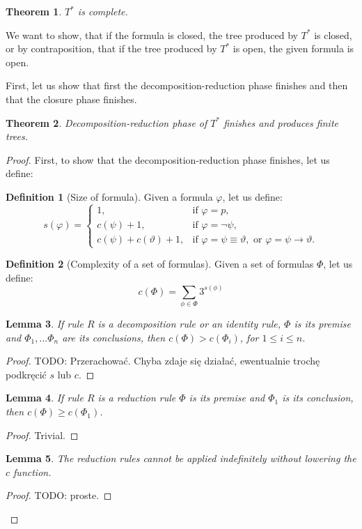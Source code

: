 \documentclass{article}
\newtheorem{theorem}{Theorem}
\newtheorem{lemma}[theorem]{Lemma}
\theoremstyle{definition}
\newtheorem{definition}{Definition}[section]
\newcommand*{\Ts}{T^*}
\begin{document}
\begin{theorem}
    $\Ts$ is complete.
\end{theorem}

We want to show, that if the formula is closed, the tree produced by $\Ts$ is closed, or by contraposition, that if the tree produced by $\Ts$ is open, the given formula is open.


First, let us show that first the decomposition-reduction phase finishes and then that the closure phase finishes.

\begin{theorem}
    Decomposition-reduction phase of $\Ts$ finishes and produces finite trees.
\end{theorem}
\begin{proof}

    First, to show that the decomposition-reduction phase finishes, let us define:

    \begin{definition}[Size of formula]
        Given a formula $\varphi$, let us define:
        $$
        s(\varphi) = \begin{cases}
            1, &\text{if } \varphi = p,\\
            c(\psi) + 1, &\text{if } \varphi = \lnot \psi,\\
            c(\psi) + c(\vartheta) + 1, &\text{if } \varphi = \psi \equiv \vartheta,\text{ or } \varphi = \psi \rightarrow \vartheta.
        \end{cases}
        $$
    \end{definition}
    \begin{definition}[Complexity of a set of formulas]
        Given a set of formulas $\Phi$, let us define:
        $$
            c(\Phi) = \sum_{\phi \in \Phi} 3^{s(\phi)}
        $$
    \end{definition}

    \begin{lemma}
        \label{l_c}
        If rule $R$ is a decomposition rule or an identity rule, $\Phi$ is its premise and $\Phi_1, ... \Phi_n$ are its conclusions, then $c(\Phi) > c(\Phi_i)$, for $1 \leq i \leq n$.
    \end{lemma}
    \begin{proof}
        TODO: Przerachować. Chyba zdaje się działać, ewentualnie trochę podkręcić $s$ lub $c$.
    \end{proof}
    \begin{lemma}
        \label{l_c2}
        If rule $R$ is a reduction rule $\Phi$ is its premise and $\Phi_1$ is its conclusion, then $c(\Phi) \geq c(\Phi_1)$.
    \end{lemma}
    \begin{proof}
        Trivial.
    \end{proof}
    \begin{lemma}
        \label{l_c3}
        The reduction rules cannot be applied indefinitely without lowering the $c$ function.
    \end{lemma}
    \begin{proof}
        TODO: proste.
    \end{proof}


\end{proof}
\end{document}
